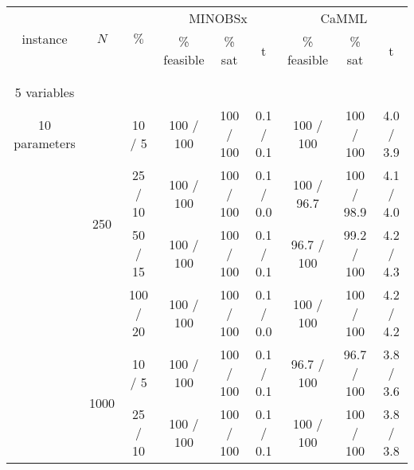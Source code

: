 \documentclass[twoside,11pt]{article}
\begin{document}
\begin{table}[H]
\scriptsize
\renewcommand\theadfont{}
\centering
\begin{tabular}{  c | c | c || c | c | c || c | c | c }


\multirow{2}{*}{instance} & \multirow{2}{*}{$N$} & \multirow{2}{*}{$\%$} & \multicolumn{3}{c||}{MINOBSx} & \multicolumn{3}{c}{CaMML} \\ [2ex]
	& & &  \% feasible & \% sat & t  & \% feasible & \% sat & t  \\
	
\hhline {=|=|=||=|=|=||=|=|=}


\multirow{8}{*}{\thead{\textbf{cancer} \\ \\ 5 variables \\ 10 parameters}} & \multirow{4}{*}{250} & 10 / 5 & 100 / 100 & 100 / 100  & 0.1 / 0.1 & 100 / 100 & 100 / 100 & 4.0 / 3.9  \\

& & 25 / 10 & 100 / 100 & 100 / 100  & 0.1 / 0.0 & \cellcolor{yellow!100} 100 / 96.7 & \cellcolor{yellow!100} 100 / 98.9 & 4.1 / 4.0 \\
	
& & 50 / 15 & 100 / 100 & 100 / 100  & 0.1 / 0.1 & \cellcolor{yellow!100} 96.7 / 100 & \cellcolor{yellow!100} 99.2 / 100 & 4.2 / 4.3 \\

& & 100 / 20 & 100 / 100 & 100 / 100  & 0.1 / 0.0 &  100 / 100 & 100 / 100 & 4.2 / 4.2 \\

\hhline {~|-|-||-|-|-||-|-|-}

& \multirow{4}{*}{1000}

& 10 / 5 & 100 / 100 & 100 / 100 & 0.1 / 0.1 & \cellcolor{yellow!100} 96.7 / 100 & \cellcolor{yellow!100} 96.7 / 100 & 3.8 / 3.6 \\

& & 25 / 10  & 100 / 100 & 100 / 100  & 0.1 / 0.1 & 100 / 100 & 100 / 100 & 3.8 / 3.8 \\
	

\end{tabular}
\end{table}
\end{document}
